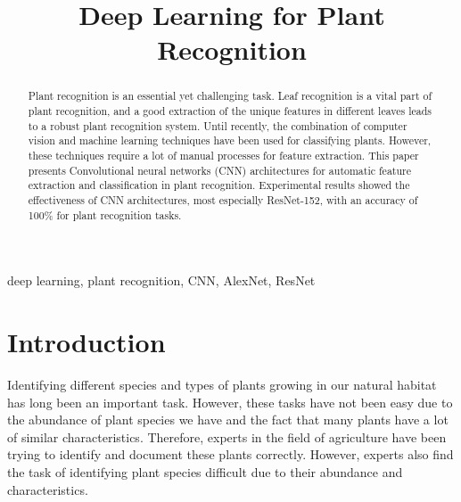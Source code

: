 \documentclass[conference]{IEEEtran}
\begin{document}
\title{Deep Learning for Plant Recognition}

\author{

}

\maketitle

\begin{abstract}
Plant recognition is an essential yet challenging task. Leaf recognition is a vital part of plant recognition, and a good extraction of the unique features in different leaves leads to a robust plant recognition system. Until recently, the combination of computer vision and machine learning techniques have been used for classifying plants. However, these techniques require a lot of manual processes for feature extraction. This paper presents Convolutional neural networks (CNN) architectures for automatic feature extraction and classification in plant recognition. Experimental results showed the effectiveness of CNN architectures, most especially ResNet-152, with an accuracy of 100\% for plant recognition tasks.

\end{abstract}

\begin{IEEEkeywords}
deep learning, plant recognition, CNN, AlexNet, ResNet
\end{IEEEkeywords}

\section{Introduction}
Identifying different species and types of plants growing in our natural habitat has long been an important task. However, these tasks have not been easy due to the abundance of plant species we have and the fact that many plants have a lot of similar characteristics. Therefore, experts in the field of agriculture have been trying to identify and document these plants correctly. However, experts also find the task of identifying plant species difficult due to their abundance and characteristics.
\end{document}
